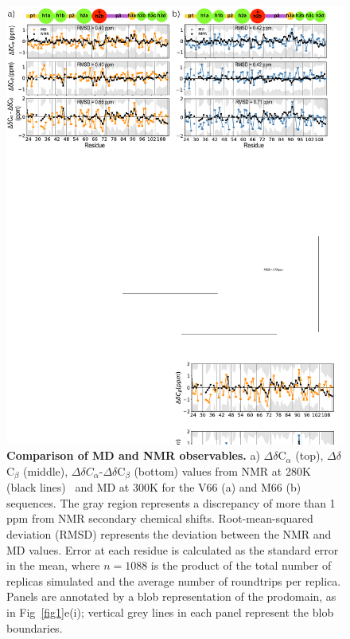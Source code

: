 \documentclass[10pt,letterpaper]{article}
\begin{document}
\begin{figure}[!ht]
\includegraphics[scale=0.5,width=\textwidth,trim={0 0cm 0 0cm},clip]{./figures/fig2.pdf}
\caption{{\bf Comparison of MD and NMR observables.} a) $\Delta$$\delta$C$_{\alpha}$ (top), 
$\Delta$$\delta$C$_{\beta}$ (middle), 
$\Delta$$\delta$$C_{\alpha}$-$\Delta$$\delta$C$_{\beta}$ (bottom) values from NMR at 280K (black lines)~\cite{Anastasia2013} and MD at 300K for the V66 (a) and M66 (b) sequences. The gray region represents a discrepancy of more than 1 ppm from NMR secondary chemical shifts. Root-mean-squared deviation (RMSD) represents the deviation between the NMR and MD values. Error at each residue is calculated as the standard error in the mean, where $n = 1088$ is the product of the total number of replicas simulated and the average number of roundtrips per replica. Panels are annotated by a blob representation of the prodomain, as in Fig~\ref{fig1}e(i); vertical grey lines in each panel represent the blob boundaries.}
\label{fig2} 
\end{figure}
\end{document}
